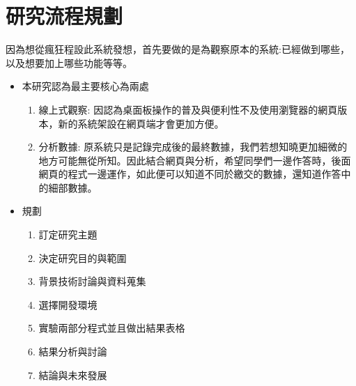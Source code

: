 \section{研究流程規劃}

因為想從瘋狂程設此系統發想，首先要做的是為觀察原本的系統:已經做到哪些，以及想要加上哪些功能等等。

\begin{itemize}%
	\item 本研究認為最主要核心為兩處
		\begin{enumerate}[1.]%
			\item 線上式觀察:
			因認為桌面板操作的普及與便利性不及使用瀏覽器的網頁版本，新的系統架設在網頁端才會更加方便。
			\item 分析數據:
			原系統只是記錄完成後的最終數據，我們若想知曉更加細微的地方可能無從所知。因此結合網頁與分析，希望同學們一邊作答時，後面網頁的程式一邊運作，如此便可以知道不同於繳交的數據，還知道作答中的細部數據。
		\end{enumerate}

	\item 規劃
		\begin{enumerate}[1.]
			\item 訂定研究主題
			\item 決定研究目的與範圍
			\item 背景技術討論與資料蒐集
			\item 選擇開發環境
			\item 實驗兩部分程式並且做出結果表格
			\item 結果分析與討論
			\item 結論與未來發展
		\end{enumerate}
\end{itemize}
